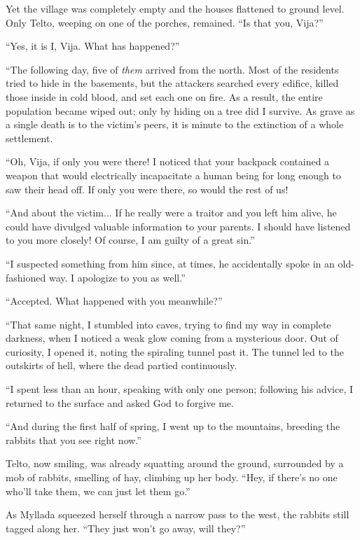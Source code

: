 Yet the village was completely empty and the houses flattened to ground level. Only Telto, weeping on one of the porches, remained. ``Is that you, Vija?''

``Yes, it is I, Vija. What has happened?''

``The following day, five of \emph{them} arrived from the north. Most of the residents tried to hide in the basements, but the attackers searched every edifice, killed those inside in cold blood, and set each one on fire. As a result, the entire population became wiped out; only by hiding on a tree did I survive. As grave as a single death is to the victim's peers, it is minute to the extinction of a whole settlement.

``Oh, Vija, if only you were there! I noticed that your backpack contained a weapon that would electrically incapacitate a human being for long enough to saw their head off. If only you were there, so would the rest of us!

``And about the victim... If he really were a traitor and you left him alive, he could have divulged valuable information to your parents. I should have listened to you more closely! Of course, I am guilty of a great sin.''

``I suspected something from him since, at times, he accidentally spoke in an old-fashioned way. I apologize to you as well.''

``Accepted. What happened with you meanwhile?''

``That same night, I stumbled into caves, trying to find my way in complete darkness, when I noticed a weak glow coming from a mysterious door. Out of curiosity, I opened it, noting the spiraling tunnel past it. The tunnel led to the outskirts of hell, where the dead partied continuously.

``I spent less than an hour, speaking with only one person; following his advice, I returned to the surface and asked God to forgive me.

``And during the first half of spring, I went up to the mountains, breeding the rabbits that you see right now.''

Telto, now smiling, was already squatting around the ground, surrounded by a mob of rabbits, smelling of hay, climbing up her body. ``Hey, if there's no one who'll take them, we can just let them go.''

\centeredstars

As Myllada squeezed herself through a narrow pass to the west, the rabbits still tagged along her. ``They just won't go away, will they?''

